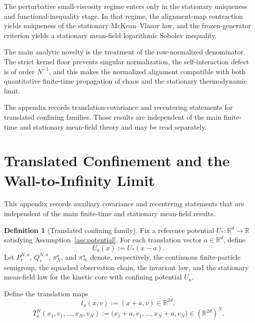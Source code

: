 \documentclass[11pt]{article}
\theoremstyle{definition}
\newtheorem{definition}[theorem]{Definition}
\theoremstyle{remark}
\newcommand{\R}{\mathbb{R}}
\begin{document}
The perturbative small-viscosity regime enters only in the stationary
uniqueness and functional-inequality stage. In that regime, the alignment-map
contraction yields uniqueness of the stationary McKean--Vlasov law, and the
frozen-generator criterion yields a stationary mean-field logarithmic Sobolev
inequality.

The main analytic novelty is the treatment of the row-normalized denominator.
The strict kernel floor prevents singular normalization, the self-interaction
defect is of order \(N^{-1}\), and this makes the normalized alignment
compatible with both quantitative finite-time propagation of chaos and the
stationary thermodynamic limit.

The appendix records translation-covariance and recentering statements for
translated confining families. Those results are independent of the main
finite-time and stationary mean-field theory and may be read separately.

\appendix

\section{Translated Confinement and the Wall-to-Infinity Limit}

This appendix records auxiliary covariance and recentering statements that are
independent of the main finite-time and stationary mean-field results.

\begin{definition}[Translated confining family]\label{def:translated-family}
Fix a reference potential \(U_*:\R^d\to\R\) satisfying
Assumption~\ref{ass:potential}. For each translation vector \(a\in\R^d\), define
\[
U_a(x):=U_*(x-a).
\]
Let \(P_t^{N,a}\), \(Q_\tau^{N,a}\), \(\pi_N^a\), and \(\pi_\infty^a\) denote,
respectively, the continuous finite-particle semigroup, the squashed observation
chain, the invariant law, and the stationary mean-field law for the kinetic core
with confining potential \(U_a\).

Define the translation maps
\[
t_a(x,v):=(x+a,v)\in\R^{2d},
\]
\[
T_a^N(x_1,v_1,\dots,x_N,v_N)
:=
\bigl(x_1+a,v_1,\dots,x_N+a,v_N\bigr)\in(\R^{2d})^N.
\]
\end{definition}
\end{document}
